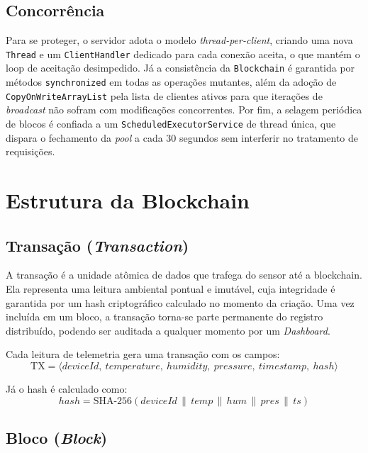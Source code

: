 \documentclass[12pt, a4paper]{article}
\begin{document}
\subsection{Concorrência}

Para se proteger, o servidor adota o modelo \emph{thread-per-client}, criando uma nova \texttt{Thread} e 
um \texttt{ClientHandler} dedicado para cada conexão aceita, o que mantém o loop de 
aceitação desimpedido. Já a consistência da \texttt{Blockchain} é garantida por métodos 
\texttt{synchronized} em todas as operações mutantes, além da adoção de 
\texttt{CopyOnWriteArrayList} pela lista de clientes ativos para que iterações de 
\emph{broadcast} não sofram com modificações concorrentes. Por fim, a selagem periódica de blocos é confiada a um 
\texttt{ScheduledExecutorService} de thread única, que dispara o fechamento da \emph{pool} a 
cada 30 segundos sem interferir no tratamento de requisições.


\section{Estrutura da Blockchain}

\subsection{Transação (\textit{Transaction})}

A transação é a unidade atômica de dados que trafega do sensor até a blockchain.
Ela representa uma leitura ambiental pontual e imutável, cuja integridade é
garantida por um hash criptográfico calculado no momento da criação. Uma vez
incluída em um bloco, a transação torna-se parte permanente do registro
distribuído, podendo ser auditada a qualquer momento por um \emph{Dashboard}.

Cada leitura de telemetria gera uma transação com os campos:
\[
  \mathrm{TX} = \langle \mathit{deviceId},\ \mathit{temperature},\ \mathit{humidity},\ \mathit{pressure},\ \mathit{timestamp},\ \mathit{hash} \rangle
\]

Já o hash é calculado como:
\[
  \mathit{hash} = \mathrm{SHA\text{-}256}\!\left(\mathit{deviceId}\,\|\,\mathit{temp}\,\|\,\mathit{hum}\,\|\,\mathit{pres}\,\|\,\mathit{ts}\right)
\]

\subsection{Bloco (\textit{Block})}
\end{document}
